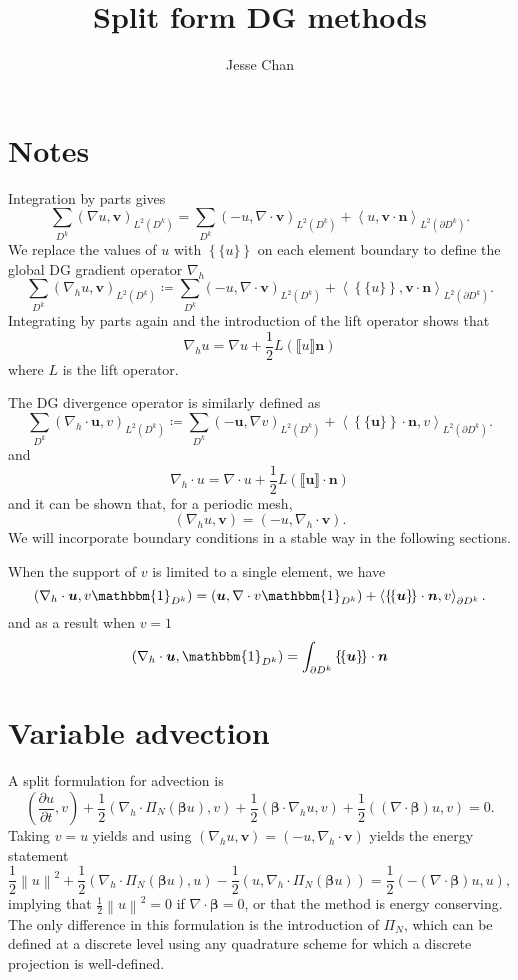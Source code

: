 \documentclass[preprint,10pt]{article}
\date{}
\author{Jesse Chan}
\title{Split form DG methods}
\newcommand{\bbm}[1]{\mathbbm{#1}}
\newcommand{\pd}[2]{\frac{\partial#1}{\partial#2}}
\newcommand{\nor}[1]{\left\| #1 \right\|}
\newcommand{\LRp}[1]{\left( #1 \right)}
\newcommand{\LRa}[1]{\left\langle #1 \right\rangle}
\newcommand{\LRc}[1]{\left\{ #1 \right\}}
\newcommand{\Grad} {\ensuremath{\nabla}}
\newcommand{\jump}[1] {\ensuremath{\llbracket#1\rrbracket}}
\newcommand{\avg}[1] {\ensuremath{\LRc{\!\{#1\}\!}}}
\newcommand{\LK}{L^2\LRp{D^k}}
\newcommand{\LdK}{L^2\LRp{\partial D^k}}
\begin{document}
\maketitle


\section{Notes}

Integration by parts gives
\[
\sum_{D^k} \LRp{\Grad u, \bm{v}}_{\LK} = \sum_{D^k} \LRp{-u, \Grad \cdot \bm{v}}_{\LK} + \LRa{u,\bm{v}\cdot\bm{n}}_{\LdK}.
\]
We replace the values of ${u}$ with $\avg{u}$ on each element boundary to define the global DG gradient operator $\Grad_h$ 
\[
\sum_{D^k} \LRp{\Grad_h u, \bm{v}}_{\LK} \coloneqq \sum_{D^k} \LRp{-u, \Grad \cdot \bm{v}}_{\LK} + \LRa{\avg{u},\bm{v}\cdot\bm{n}}_{\LdK}.
\]
Integrating by parts again and the introduction of the lift operator shows that
\[
\Grad_h u = \Grad u + \frac{1}{2}L\LRp{\jump{u}\bm{n}}
\]
where $L$ is the lift operator.  

The DG divergence operator is similarly defined as
\[
\sum_{D^k} \LRp{\Grad_h \cdot \bm{u}, v}_{\LK} \coloneqq \sum_{D^k} \LRp{-\bm{u}, \Grad v}_{\LK} + \LRa{\avg{\bm{u}}\cdot\bm{n},v}_{\LdK}.
\]
and
\[
\Grad_h \cdot u = \Grad\cdot u + \frac{1}{2}L\LRp{\jump{\bm{u}}\cdot\bm{n}}
\]
and it can be shown that, for a periodic mesh,
\[
\LRp{\Grad_h u, \bm{v}} = \LRp{-u, \Grad_h \cdot \bm{v}}.
\]
We will incorporate boundary conditions in a stable way in the following sections.  

When the support of $v$ is limited to a single element, we have
\[
\LRp{\Grad_h\cdot \bm{u},v\bbm{1}_{D^k}} = \LRp{\bm{u}, \Grad\cdot v\bbm{1}_{D^k}}  + \LRa{\avg{\bm{u}}\cdot\bm{n},v}_{\partial D^k}.
\]
and as a result when $v = 1$
\[
\LRp{\Grad_h\cdot \bm{u},\bbm{1}_{D^k}} = \int_{\partial D^k}\avg{\bm{u}}\cdot\bm{n}
\]
\section{Variable advection}

A split formulation for advection is 
\[
\LRp{\pd{u}{t},v} + \frac{1}{2}\LRp{\Grad_h\cdot \Pi_N \LRp{ \bm{\beta}u},v} + \frac{1}{2}\LRp{\bm{\beta}\cdot\Grad_h u,v} + \frac{1}{2}\LRp{\LRp{\Grad\cdot \bm{\beta}} u,v} = 0.
\]
Taking $v = u$ yields and using $\LRp{\Grad_h u, \bm{v}} = \LRp{-u, \Grad_h \cdot \bm{v}}$ yields the energy statement
\[
\frac{1}{2}\nor{u}^2 + \frac{1}{2}\LRp{\Grad_h\cdot \Pi_N \LRp{ \bm{\beta}u},u} - \frac{1}{2}\LRp{ u, \Grad_h\cdot \Pi_N\LRp{\bm{\beta}u}} = \frac{1}{2}\LRp{-\LRp{\Grad \cdot \bm{\beta}} u,u},
\]
implying that $\frac{1}{2}\nor{u}^2 = 0$ if $\Grad\cdot \bm{\beta} = 0$, or that the method is energy conserving.  The only difference in this formulation is the introduction of $\Pi_N$, which can be defined at a discrete level using any quadrature scheme for which a discrete projection is well-defined. 
\end{document}
